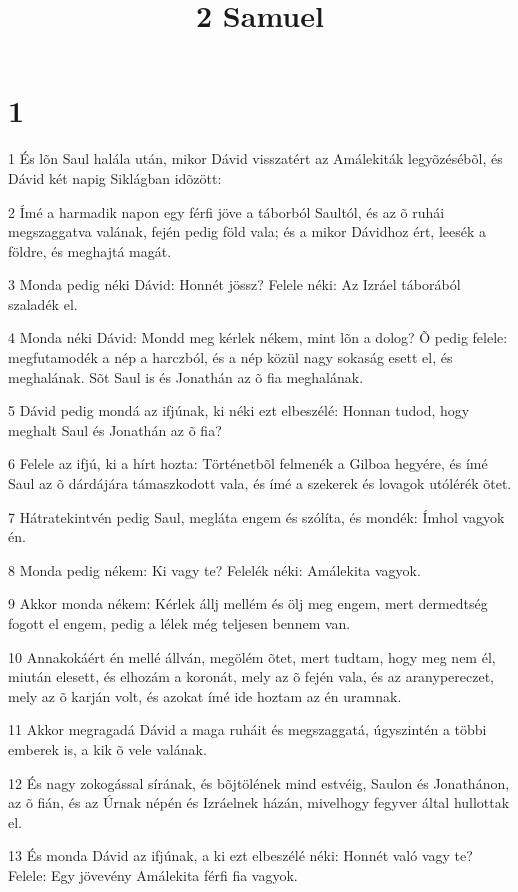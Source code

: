

\title{2 Samuel}


\chapter{1}

\par 1 És lõn Saul halála után, mikor Dávid visszatért az Amálekiták legyõzésébõl, és Dávid két napig Siklágban idõzött:
\par 2 Ímé a harmadik napon egy férfi jöve a táborból Saultól, és az õ ruhái megszaggatva valának, fején pedig föld vala; és a mikor Dávidhoz ért, leesék a földre, és meghajtá magát.
\par 3 Monda pedig néki Dávid: Honnét jössz? Felele néki: Az Izráel táborából szaladék el.
\par 4 Monda néki Dávid: Mondd meg kérlek nékem, mint lõn a dolog? Õ pedig felele: megfutamodék a nép a harczból, és a nép közül nagy sokaság esett el, és meghalának. Sõt Saul is és Jonathán az õ fia meghalának.
\par 5 Dávid pedig mondá az ifjúnak, ki néki ezt elbeszélé: Honnan tudod, hogy meghalt Saul és Jonathán az õ fia?
\par 6 Felele az ifjú, ki a hírt hozta: Történetbõl felmenék a Gilboa hegyére, és ímé Saul az õ dárdájára támaszkodott vala, és ímé a szekerek és lovagok utólérék õtet.
\par 7 Hátratekintvén pedig Saul, megláta engem és szólíta, és mondék: Ímhol vagyok én.
\par 8 Monda pedig nékem: Ki vagy te? Felelék néki: Amálekita vagyok.
\par 9 Akkor monda nékem: Kérlek állj mellém és ölj meg engem, mert dermedtség fogott el engem, pedig a lélek még teljesen bennem van.
\par 10 Annakokáért én mellé állván, megölém õtet, mert tudtam, hogy meg nem él, miután elesett, és elhozám a koronát, mely az õ fején vala, és az aranypereczet, mely az õ karján volt, és azokat ímé ide hoztam az én uramnak.
\par 11 Akkor megragadá Dávid a maga ruháit és megszaggatá, úgyszintén a többi emberek is, a kik õ vele valának.
\par 12 És nagy zokogással sírának, és bõjtölének mind estvéig, Saulon és Jonathánon, az õ fián, és az Úrnak népén és Izráelnek házán, mivelhogy fegyver által hullottak el.
\par 13 És monda Dávid az ifjúnak, a ki ezt elbeszélé néki: Honnét való vagy te? Felele: Egy jövevény Amálekita férfi fia vagyok.
